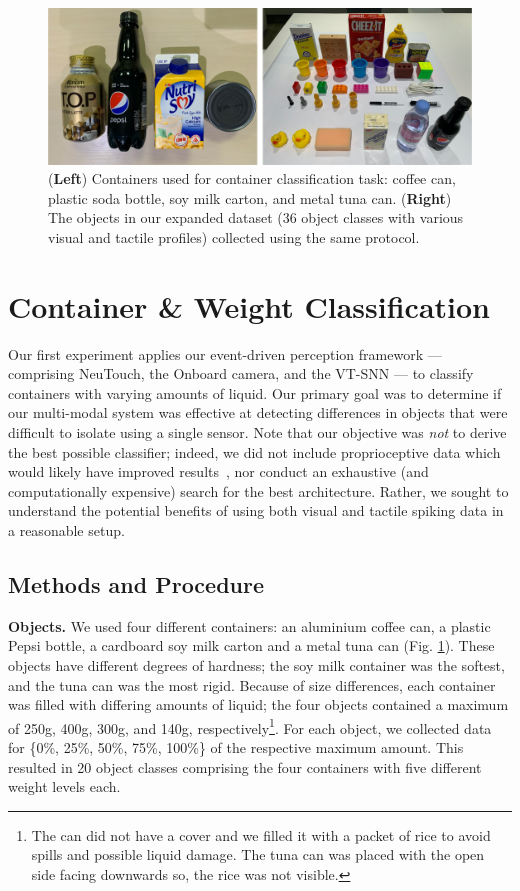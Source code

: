 \documentclass[fyp]{socreport}
\begin{document}
\begin{figure}
\centering
\includegraphics[width=0.87\columnwidth]{images/robotsetup/objects_exp1_small.png}
\caption{(\textbf{Left}) Containers used for container classification task:
  coffee can, plastic soda bottle, soy milk carton, and metal tuna can.
  (\textbf{Right}) The objects in our expanded dataset ($36$ object classes with
  various visual and tactile profiles) collected using the same protocol.}
\label{fig:expobjects}
\end{figure}

\section{Container \& Weight Classification\label{sec:container_class}}

Our first experiment applies our event-driven perception framework ---
comprising NeuTouch, the Onboard camera, and the VT-SNN --- to classify
containers with varying amounts of liquid. Our primary goal was to determine if
our multi-modal system was effective at detecting differences in objects that
were difficult to isolate using a single sensor. Note that our objective was
\emph{not} to derive the {best possible classifier}; indeed, we did not include
proprioceptive data which would likely have improved
results~\cite{lee2019making}, nor conduct an exhaustive (and computationally
expensive) search for the best architecture. Rather, we sought to understand the
potential benefits of using both visual and tactile spiking data in a reasonable
setup.

\subsection{Methods and Procedure}

\noindent\textbf{Objects.} We used four different containers: an aluminium
coffee can, a plastic Pepsi bottle, a cardboard soy milk carton and a metal tuna
can (Fig. \ref{fig:expobjects}). These objects have different degrees of
hardness; the soy milk container was the softest, and the tuna can was the most
rigid. Because of size differences, each container was filled with differing
amounts of liquid; the four objects contained a maximum of 250g, 400g, 300g, and
140g, respectively\footnote{The can did not have a cover and we filled it with a
  packet of rice to avoid spills and possible liquid damage. The tuna can was
  placed with the open side facing downwards so, the rice was not visible.}. For
each object, we collected data for \{0\%, 25\%, 50\%, 75\%, 100\%\} of the
respective maximum amount. This resulted in 20 object classes comprising the
four containers with five different weight levels each.
\end{document}
